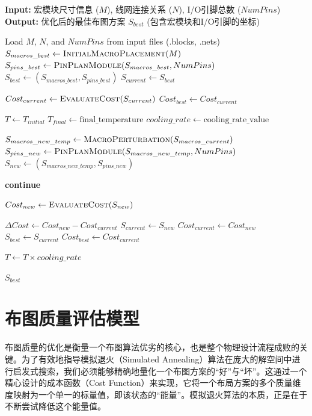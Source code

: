 \documentclass[conference]{IEEEtran}
\begin{document}
\begin{algorithm}[H] 
\caption{基于模拟退火的协同优化楼层规划器}
\label{alg:sa_floorplanning}
\begin{small} 
\begin{algorithmic}[1]
\Statex \textbf{Input:} 宏模块尺寸信息 ($M$), 线网连接关系 ($N$), I/O引脚总数 ($NumPins$)
\Statex \textbf{Output:} 优化后的最佳布图方案 $S_{best}$ (包含宏模块和I/O引脚的坐标)

\State Load $M$, $N$, and $NumPins$ from input files (.blocks, .nets)
\State $S_{macros\_best} \gets \Call{InitialMacroPlacement}{M}$ 
\State $S_{pins\_best} \gets \Call{PinPlanModule}{S_{macros\_best}, NumPins}$ 
\State $S_{best} \gets (S_{macros\_best}, S_{pins\_best})$
\State $S_{current} \gets S_{best}$

\State $Cost_{current} \gets \Call{EvaluateCost}{S_{current}}$ 
\State $Cost_{best} \gets Cost_{current}$

\State $T \gets T_{initial}$ 
\State $T_{final} \gets \text{final\_temperature}$ 
\State $cooling\_rate \gets \text{cooling\_rate\_value}$ 

    \State $S_{macros\_new\_temp} \gets \Call{MacroPerturbation}{S_{macros\_current}}$ 
    \State $S_{pins\_new}\gets\Call{PinPlanModule}{S_{macros\_new\_temp}, \allowbreak NumPins}$ 
    \State $S_{new} \gets (S_{macros\_new\_temp}, S_{pins\_new})$ 

        \State \textbf{continue} 
    \EndIf

    \State $Cost_{new} \gets \Call{EvaluateCost}{S_{new}}$

    \State $\Delta Cost \gets Cost_{new} - Cost_{current}$
        \State $S_{current} \gets S_{new}$
        \State $Cost_{current} \gets Cost_{new}$
            \State $S_{best} \gets S_{current}$
            \State $Cost_{best} \gets Cost_{current}$
        \EndIf
    \EndIf

    \State $T \gets T \times cooling\_rate$
\EndWhile


\State \Return $S_{best}$ 

\end{algorithmic}
\end{small}
\end{algorithm}



\section{布图质量评估模型}
布图质量的优化是衡量一个布图算法优劣的核心，也是整个物理设计流程成败的关键。为了有效地指导模拟退火（Simulated Annealing）算法在庞大的解空间中进行启发式搜索，我们必须能够精确地量化一个布图方案的“好”与“坏”。这通过一个精心设计的成本函数（Cost Function）来实现，它将一个布局方案的多个质量维度映射为一个单一的标量值，即该状态的“能量”。模拟退火算法的本质，正是在于不断尝试降低这个能量值。
\end{document}
